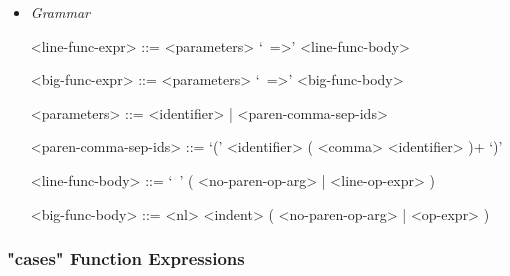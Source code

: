 \documentclass{article}
\begin{document}
\begin{itemize}
\item \textit{Grammar}
\begin{grammar}
<line-func-expr> ::= <parameters> `\ =>' <line-func-body>

<big-func-expr> ::= <parameters> `\ =>' <big-func-body>

<parameters> ::= <identifier> | <paren-comma-sep-ids>

<paren-comma-sep-ids> ::= `(' <identifier> ( <comma> <identifier> )+ `)'

<line-func-body> ::= `\ ' ( <no-paren-op-arg> | <line-op-expr> )

<big-func-body> ::= <nl> <indent> ( <no-paren-op-arg> | <op-expr> )
\end{grammar}
\end{itemize}

\subsubsection{"cases" Function Expressions}
\label{subsubsec:casessyntax}
\end{document}
